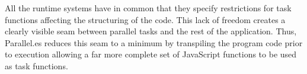 All the runtime systems have in common that they specify restrictions for task functions affecting the structuring of the code. This lack of freedom creates a clearly visible seam between parallel tasks and the rest of the application. Thus, Parallel.es reduces this seam to a minimum by transpiling the program code prior to execution allowing a far more complete set of JavaScript functions to be used as task functions.
